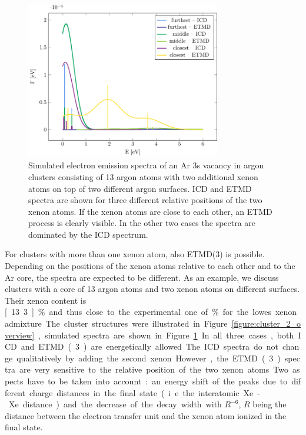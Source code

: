 \begin{figure}[ht]
 \centering
 \includegraphics[width=8.5cm]{pics/2tops.pdf}
 \caption{Simulated electron emission spectra of an Ar 3s vacancy in 
          argon clusters consisting of 13
          argon atoms with two additional xenon atoms on top of two different
          argon surfaces. ICD and ETMD spectra are shown for three
          different relative positions of the two xenon atoms. If 
          the xenon atoms are close to each other, an ETMD process is
          clearly visible. In the other two cases the spectra are dominated by
          the ICD spectrum.}
 \label{figure:2tops}
\end{figure}
%
For clusters with more than one xenon atom, also ETMD(3) is possible.
Depending on the positions of the xenon atoms relative to each other and to the Ar core, the spectra are expected to be different.
As an example, we discuss clusters with a core of 13 argon atoms and two xenon atoms on different surfaces. 
Their xenon content is \unit[13.3]{\%} and thus close to the experimental one of \unit[10-12]{\%} for the lowes xenon admixture.
The cluster structures were illustrated in Figure \ref{figure:cluster_2_overview}, simulated spectra are shown in Figure \ref{figure:2tops}.
In all three cases, both ICD and ETMD(3) are energetically allowed. The ICD
spectra do not change qualitatively by adding the second xenon.
However, the ETMD(3) spectra
are very sensitive to the relative position of the two xenon atoms.
Two aspects have to be taken into account: an energy shift of the peaks due
to different charge distances in the final state (i.e. the interatomic Xe-Xe
distance) and the decrease of the decay width with $R^{-6}$, $R$ being the distance
between the electron transfer unit and the xenon atom ionized in the final state.
